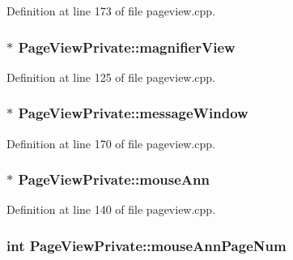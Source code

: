 Definition at line 173 of file pageview.\+cpp.

\hypertarget{classPageViewPrivate_aee1dfa250e17ccbf107395f2fe733958}{
\subsubsection[{magnifier\+View}]{$\ast$ Page\+View\+Private\+::magnifier\+View}}\label{classPageViewPrivate_aee1dfa250e17ccbf107395f2fe733958}


Definition at line 125 of file pageview.\+cpp.

\hypertarget{classPageViewPrivate_aa836af37149ea9fbfefd8de357c9194b}{
\subsubsection[{message\+Window}]{$\ast$ Page\+View\+Private\+::message\+Window}}\label{classPageViewPrivate_aa836af37149ea9fbfefd8de357c9194b}


Definition at line 170 of file pageview.\+cpp.

\hypertarget{classPageViewPrivate_ac92373de9a9cb5f2085b186a7e321a3b}{
\subsubsection[{mouse\+Ann}]{$\ast$ Page\+View\+Private\+::mouse\+Ann}}\label{classPageViewPrivate_ac92373de9a9cb5f2085b186a7e321a3b}


Definition at line 140 of file pageview.\+cpp.

\hypertarget{classPageViewPrivate_a6e1d17de5ec97192d937dae41c89ff74}{
\subsubsection[{mouse\+Ann\+Page\+Num}]{\setlength{\rightskip}{0pt plus 5cm}int Page\+View\+Private\+::mouse\+Ann\+Page\+Num}}\label{classPageViewPrivate_a6e1d17de5ec97192d937dae41c89ff74}



